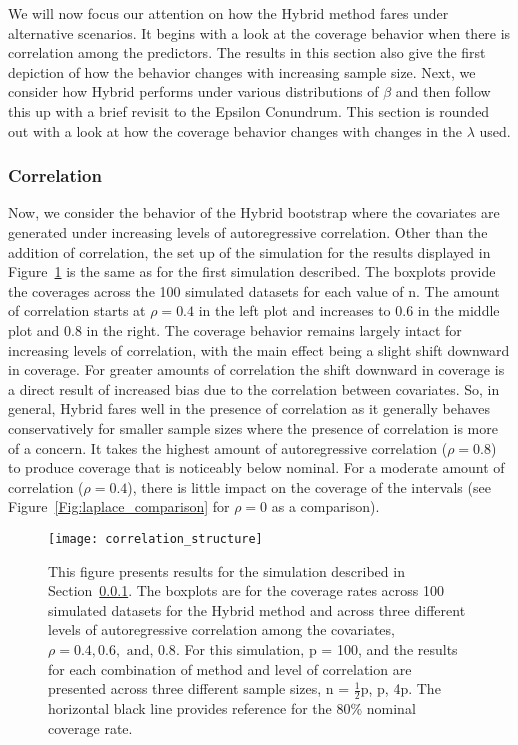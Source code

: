 We will now focus our attention on how the Hybrid method fares under alternative scenarios. It begins with a look at the coverage behavior when there is correlation among the predictors. The results in this section also give the first depiction of how the behavior changes with increasing sample size. Next, we consider how Hybrid performs under various distributions of $\beta$ and then follow this up with a brief revisit to the Epsilon Conundrum. This section is rounded out with a look at how the coverage behavior changes with changes in the $\lambda$ used.

\subsubsection{Correlation}
\label{Sec:correlation}

Now, we consider the behavior of the Hybrid bootstrap where the covariates are generated under increasing levels of autoregressive correlation. Other than the addition of correlation, the set up of the simulation for the results displayed in Figure~\ref{Fig:correlation_structure} is the same as for the first simulation described. The boxplots provide the coverages across the 100 simulated datasets for each value of n. The amount of correlation starts at $\rho = 0.4$ in the left plot and increases to $0.6$ in the middle plot and $0.8$ in the right. The coverage behavior remains largely intact for increasing levels of correlation, with the main effect being a slight shift downward in coverage. For greater amounts of correlation the shift downward in coverage is a direct result of increased bias due to the correlation between covariates. So, in general, Hybrid fares well in the presence of correlation as it generally behaves conservatively for smaller sample sizes where the presence of correlation is more of a concern. It takes the highest amount of autoregressive correlation ($\rho = 0.8$) to produce coverage that is noticeably below nominal. For a moderate amount of correlation ($\rho = 0.4$), there is little impact on the coverage of the intervals (see Figure~\ref{Fig:laplace_comparison} for $\rho = 0$ as a comparison).

\begin{figure}[hbtp]
  \begin{center}
  \texttt{[image: correlation\_structure]}
  \caption{\label{Fig:correlation_structure} This figure presents results for the simulation described in Section~\ref{Sec:correlation}. The boxplots are for the coverage rates across 100 simulated datasets for the Hybrid method and across three different levels of autoregressive correlation among the covariates, $\rho = 0.4, 0.6, \text{ and, } 0.8$. For this simulation, p = 100, and the results for each combination of method and level of correlation are presented across three different sample sizes, n = $\frac{1}{2}$p, p, 4p. The horizontal black line provides reference for the 80\% nominal coverage rate.}
  \end{center}
\end{figure}

